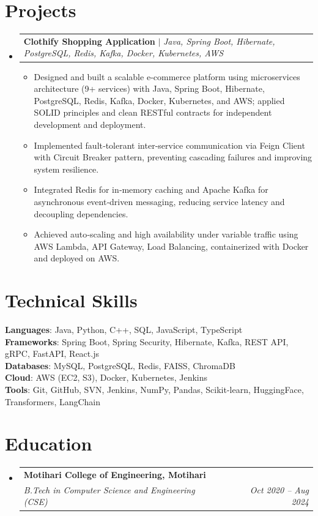 \documentclass[10pt, letterpaper]{article}
\makeatletter
\newcommand{\resumeItem}[1]{
  \item\small{
    {#1 \vspace{-2pt}}
  }
}
\newcommand{\resumeSubheading}[4]{
  \vspace{-2pt}\item
    \begin{tabular*}{1.0\textwidth}[t]{l@{\extracolsep{\fill}}r}
      \textbf{#1} & \textbf{\small #2} \\
      \textit{\small#3} & \textit{\small #4} \\
    \end{tabular*}\vspace{-7pt}
}
\newcommand{\resumeProjectHeading}[2]{
    \item
    \begin{tabular*}{1.0\textwidth}{l@{\extracolsep{\fill}}r}
      \small#1 & \textbf{\small #2} \\
    \end{tabular*}\vspace{-7pt}
}
\newcommand{\resumeSubHeadingListStart}{\begin{itemize}[leftmargin=0.0in, label={}]}
\newcommand{\resumeSubHeadingListEnd}{\end{itemize}}
\newcommand{\resumeItemListStart}{\begin{itemize}[leftmargin=0.15in]}
\newcommand{\resumeItemListEnd}{\end{itemize}\vspace{-5pt}}
\makeatother
\begin{document}
\section{Projects}
\resumeSubHeadingListStart
  \resumeProjectHeading{\textbf{Clothify Shopping Application} $|$ \emph{Java, Spring Boot, Hibernate, PostgreSQL, Redis, Kafka, Docker, Kubernetes, AWS}}{}
    \resumeItemListStart
      \resumeItem{Designed and built a scalable e‑commerce platform using microservices architecture (9+ services) with Java, Spring Boot, Hibernate, PostgreSQL, Redis, Kafka, Docker, Kubernetes, and AWS; applied SOLID principles and clean RESTful contracts for independent development and deployment.}
      \resumeItem{Implemented fault‑tolerant inter‑service communication via Feign Client with Circuit Breaker pattern, preventing cascading failures and improving system resilience.}
      \resumeItem{Integrated Redis for in‑memory caching and Apache Kafka for asynchronous event‑driven messaging, reducing service latency and decoupling dependencies.}
      \resumeItem{Achieved auto‑scaling and high availability under variable traffic using AWS Lambda, API Gateway, Load Balancing, containerized with Docker and deployed on AWS.}
    \resumeItemListEnd
\resumeSubHeadingListEnd


\section{Technical Skills}
\begin{itemize}[leftmargin=0.15in, label={}]
  \small{\item{
    \textbf{Languages}{: Java, Python, C++, SQL, JavaScript, TypeScript} \\
    \textbf{Frameworks}{: Spring Boot, Spring Security, Hibernate, Kafka, REST API, gRPC, FastAPI, React.js} \\
    \textbf{Databases}{: MySQL, PostgreSQL, Redis, FAISS, ChromaDB} \\
    \textbf{Cloud}{: AWS (EC2, S3), Docker, Kubernetes, Jenkins} \\
    \textbf{Tools}{: Git, GitHub, SVN, Jenkins, NumPy, Pandas, Scikit-learn, HuggingFace, Transformers, LangChain} \\
  }}
\end{itemize}


\section{Education}
\resumeSubHeadingListStart
  \resumeSubheading{Motihari College of Engineering, Motihari}{}{B.Tech in Computer Science and Engineering (CSE)}{Oct 2020 -- Aug 2024}
\resumeSubHeadingListEnd
\end{document}
